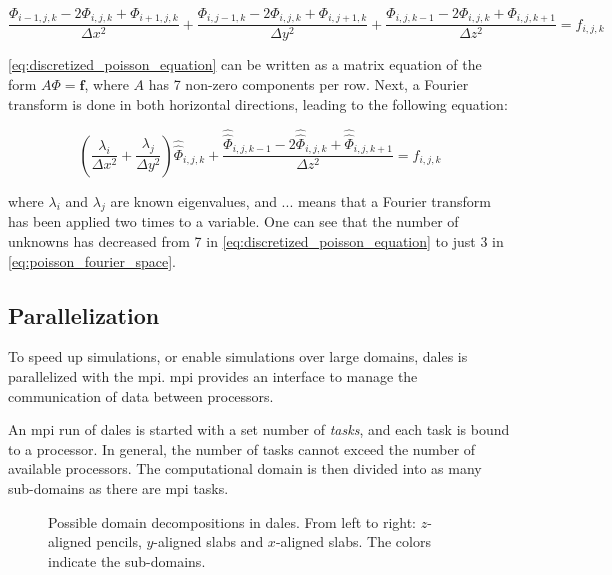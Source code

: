 \begin{equation}
    \frac{\Phi_{i-1,j,k} - 2 \Phi_{i,j,k} + \Phi_{i+1,j,k}}{\Delta x^2} + \frac{\Phi_{i,j-1,k} - 2 \Phi_{i,j,k} + \Phi_{i,j+1,k}}{\Delta y^2} + \frac{\Phi_{i,j,k-1} - 2 \Phi_{i,j,k} + \Phi_{i,j,k+1}}{\Delta z^2} = f_{i,j,k}
    \label{eq:discretized_poisson_equation}
\end{equation}

\autoref{eq:discretized_poisson_equation} can be written as a matrix equation of the form $A \Phi = \mathbf{f}$, where $A$ has 7 non-zero components per row. Next, a Fourier transform is done in both horizontal directions, leading to the following equation: 

\begin{equation}
    \left( \frac{\lambda_i}{\Delta x^2} + \frac{\lambda_j}{\Delta y^2} \right) \hat{\hat{\Phi}}_{i,j,k} + \frac{\hat{\hat{\Phi}}_{i,j,k-1} - 2 \hat{\hat{\Phi}}_{i,j,k} + \hat{\hat{\Phi}}_{i,j,k+1}}{\Delta z^2} = f_{i,j,k}
    \label{eq:poisson_fourier_space}
\end{equation}

where $\lambda_i$ and $\lambda_j$ are known eigenvalues, and ...  means that a Fourier transform has been applied two times to a variable. One can see that the number of unknowns has decreased from 7 in \autoref{eq:discretized_poisson_equation} to just 3 in \autoref{eq:poisson_fourier_space}. 

\subsection{Parallelization}
To speed up simulations, or enable simulations over large domains, \acrshort{dales} is parallelized with the \acrfull{mpi}. \acrshort{mpi} provides an interface to manage the communication of data between processors. 

An \acrshort{mpi} run of \acrshort{dales} is started with a set number of \emph{tasks}, and each task is bound to a processor. In general, the number of tasks cannot exceed the number of available processors. The computational domain is then divided into as many sub-domains as there are \acrshort{mpi} tasks. 

\begin{figure}[H]
    \centering
    
    \caption{Possible domain decompositions in \acrshort{dales}. From left to right: $z$-aligned pencils, $y$-aligned slabs and $x$-aligned slabs. The colors indicate the sub-domains.}
    \label{fig:dales_domain_decomposition}
\end{figure}